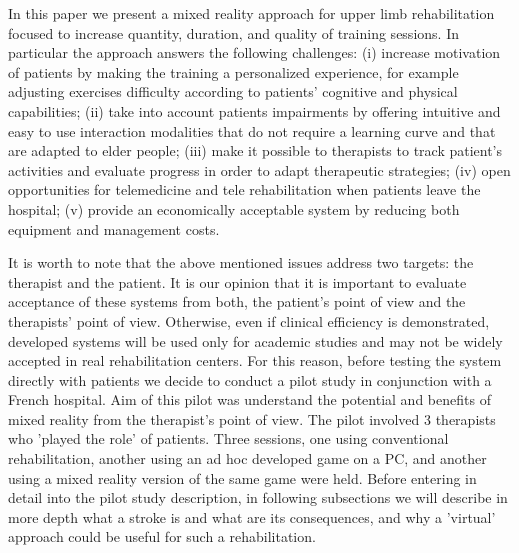 \documentclass[preprint,authoryear,12pt]{elsarticle}
\begin{document}
 In this paper we  present a mixed reality approach for upper limb rehabilitation focused  to increase quantity, duration, and quality of training sessions. In particular the approach answers the following challenges:
(i) increase motivation of patients by making the training a personalized experience, for example adjusting exercises difficulty according to patients' cognitive and physical capabilities; (ii) take into account patients impairments by offering intuitive and easy to use interaction modalities that do not require a learning curve and that are adapted to elder people; (iii) make it possible to therapists to track patient's activities and evaluate progress in order to  adapt therapeutic strategies; (iv) open opportunities for telemedicine and tele rehabilitation when patients leave the hospital; (v) provide an economically acceptable system by reducing both equipment and management costs.

It is worth to note that the above mentioned issues address two targets: the therapist and the patient. It is our opinion that  it is important to evaluate acceptance of these systems from both, the patient's point of view and the therapists' point of view. Otherwise, even if clinical efficiency is demonstrated, developed systems will be used only for academic studies and may not be widely accepted in real rehabilitation centers. 
For this reason, before testing the system directly with patients we decide to conduct a pilot study in conjunction with a French hospital. Aim of this pilot was understand the potential and benefits of mixed reality from the therapist's point of view. The pilot involved 3 therapists who 'played the role' of  patients. Three sessions, one using conventional rehabilitation, another using an ad hoc developed game on a PC, and another using a mixed reality version of the same game were held. 
Before entering in detail into the pilot study description, in following subsections we will describe in more depth what a stroke is and what are its consequences, and why a 'virtual'  approach could be useful for such a rehabilitation.
\end{document}
